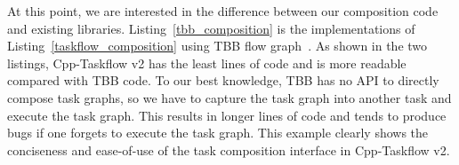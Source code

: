\documentclass[conference]{IEEEtran}
\begin{document}
At this point, we are interested in the difference between our composition code
and existing libraries.
Listing~\ref{tbb_composition} is the 
implementations of Listing~\ref{taskflow_composition} using TBB flow graph~\cite{tbb}. 
%
%
As shown in the two listings,
Cpp-Taskflow v2 has the least lines of code %
and is more readable compared with TBB code.   
To our best knowledge, TBB has no API to directly compose task graphs, so we have to 
capture the task graph into another task and execute the task graph. This results in 
longer lines of code and tends to produce bugs if one forgets to execute the task graph.
This example clearly shows the conciseness and ease-of-use of the task 
composition interface in Cpp-Taskflow v2.  


%
\end{document}
